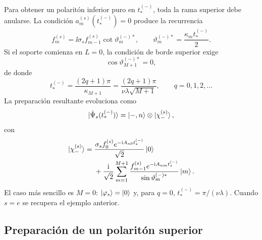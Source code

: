 Para obtener un polarit\'on inferior puro en $t_*^{(-)}$, toda la rama
superior debe anularse. La condici\'on $a_m^{(s)}(t_*^{(-)})=0$ produce la
recurrencia
\begin{equation}
  \boxed{
  f_m^{(s)}
  =
  \ii\sigma_s f_{m-1}^{(s)}
  \cot\vartheta_m^{(-)*},
  \qquad
  \vartheta_m^{(-)*}
  =
  \frac{\kappa_m t_*^{(-)}}{2}.
  }
\end{equation}
Si el soporte comienza en $L=0$, la condici\'on de borde superior exige
\begin{equation}
  \cos\vartheta_{M+1}^{(-)*}=0,
\end{equation}
de donde
\begin{equation}
  \boxed{
  t_*^{(-)}
  =
  \frac{(2q+1)\pi}{\kappa_{M+1}}
  =
  \frac{(2q+1)\pi}{\nu\lambda\sqrt{M+1}},
  \qquad q=0,1,2,\ldots
  }
\end{equation}
La preparaci\'on resultante evoluciona como
\begin{equation}
  \ket{\tilde\Psi_s(t_*^{(-)})}
  =
  \ket{-,n}\otimes\ket{\chi_-^{(s)}},
\end{equation}
con
\begin{equation}
\begin{aligned}
  \ket{\chi_-^{(s)}}
  ={}&
  \frac{\sigma_s f_0^{(s)}e^{-\mathrm{i} A_{n0}t_*^{(-)}}}{\sqrt2}\ket 0
  \\
  &+
  \frac{\mathrm{i}}{\sqrt2}
  \sum_{m=1}^{M+1}
  \frac{f_{m-1}^{(s)}e^{-\mathrm{i} A_{nm}t_*^{(-)}}}
  {\sin\vartheta_m^{(-)*}}\ket m.
\end{aligned}
\end{equation}
El caso m\'as sencillo es $M=0$: $\ket{\varphi_s}=\ket 0$ y, para $q=0$,
$t_*^{(-)}=\pi/(\nu\lambda)$. Cuando $s=e$ se recupera el ejemplo anterior.

\subsection{Preparaci\'on de un polarit\'on superior}

